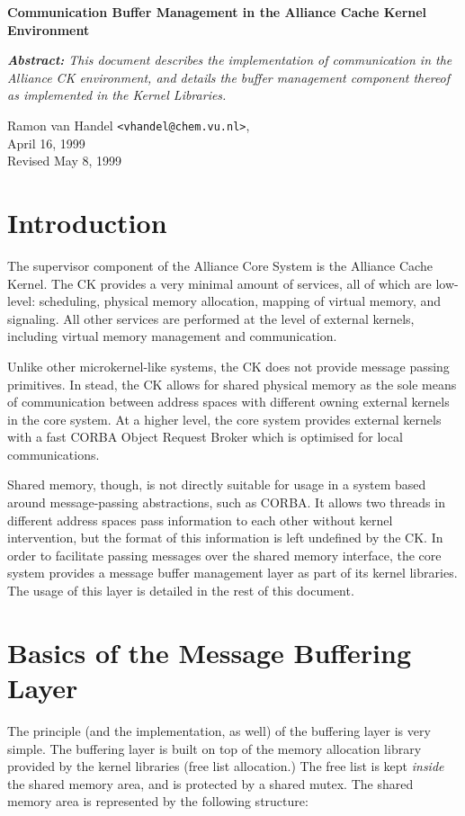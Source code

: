 \documentclass[]{article}
\begin{document}
\begin{center}
\LARGE \bf
Communication Buffer Management in the Alliance Cache Kernel Environment
\normalsize
\end{center}

{ \it 
{\bf Abstract: } This document describes the implementation of
communication in the Alliance CK environment, and details the buffer
management component thereof as implemented in the Kernel Libraries. }


Ramon van Handel {\tt <vhandel@chem.vu.nl>},\\
April 16, 1999\\
Revised May 8, 1999

\section{Introduction}
The supervisor component of the Alliance Core System is the Alliance Cache
Kernel. The CK provides a very minimal amount of services, all of which
are low-level:  scheduling, physical memory allocation, mapping of virtual
memory, and signaling.  All other services are performed at the level of
external kernels, including virtual memory management and communication.

Unlike other microkernel-like systems, the CK does not provide message
passing primitives.  In stead, the CK allows for shared physical memory as
the sole means of communication between address spaces with different
owning external kernels in the core system.  At a higher level, the core
system provides external kernels with a fast CORBA Object Request Broker
which is optimised for local communications.

Shared memory, though, is not directly suitable for usage in a system
based around message-passing abstractions, such as CORBA.  It allows two
threads in different address spaces pass information to each other without
kernel intervention, but the format of this information is left undefined
by the CK. In order to facilitate passing messages over the shared memory
interface, the core system provides a message buffer management layer as
part of its kernel libraries.  The usage of this layer is detailed in the
rest of this document.

\section{Basics of the Message Buffering Layer}
The principle (and the implementation, as well) of the buffering layer is
very simple. The buffering layer is built on top of the memory allocation
library provided by the kernel libraries (free list allocation.) The free
list is kept {\it inside\/} the shared memory area, and is protected by a
shared mutex. The shared memory area is represented by the following
structure:
\end{document}
